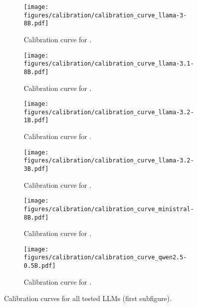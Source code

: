 \begin{figure}[ht]
    \centering
    
    \begin{subfigure}{0.233\textwidth}
        \centering
        \texttt{[image: figures/calibration/calibration\_curve\_llama-3-8B.pdf]}
        \caption{Calibration curve for \llamaa.}
        \label{fig:app_cal_fig1}
    \end{subfigure}
    \hfill
    \begin{subfigure}{0.233\textwidth}
        \centering
        \texttt{[image: figures/calibration/calibration\_curve\_llama-3.1-8B.pdf]}
        \caption{Calibration curve for \llamab.}
        \label{fig:app_cal_fig2}
    \end{subfigure}
    
    \vspace{0.5cm}
    
    \begin{subfigure}{0.233\textwidth}
        \centering
        \texttt{[image: figures/calibration/calibration\_curve\_llama-3.2-1B.pdf]}
        \caption{Calibration curve for \llamac.}
        \label{fig:app_cal_fig3}
    \end{subfigure}
    \hfill
    \begin{subfigure}{0.233\textwidth}
        \centering
        \texttt{[image: figures/calibration/calibration\_curve\_llama-3.2-3B.pdf]}
        \caption{Calibration curve for \llamad.}
        \label{fig:app_cal_fig4}
    \end{subfigure}

    \vspace{0.5cm}

    \begin{subfigure}{0.233\textwidth}
        \centering
        \texttt{[image: figures/calibration/calibration\_curve\_ministral-8B.pdf]}
        \caption{Calibration curve for \ministral.}
        \label{fig:app_cal_fig5}
    \end{subfigure}
    \hfill
    \begin{subfigure}{0.233\textwidth}
        \centering
        \texttt{[image: figures/calibration/calibration\_curve\_qwen2.5-0.5B.pdf]}
        \caption{Calibration curve for \qwena.}
        \label{fig:app_cal_fig6}
    \end{subfigure}

    
    \caption{Calibration curves for all tested LLMs (first subfigure).}
    \label{fig:app_calibration_curve_1}
\end{figure}




